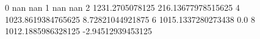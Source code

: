 0 nan nan
1 nan nan
2 1231.2705078125 216.13677978515625
4 1023.8619384765625 8.72821044921875
6 1015.1337280273438 0.0
8 1012.1885986328125 -2.94512939453125
